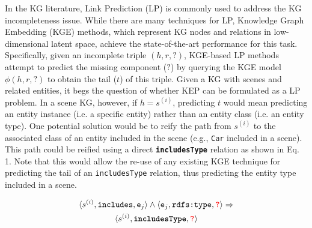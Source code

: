 \documentclass[conference]{IEEEtran}
\begin{document}
In the KG literature, Link Prediction (LP) is commonly used to address the KG incompleteness issue. While there are many techniques for LP, Knowledge Graph Embedding (KGE) methods, which represent KG nodes and relations in low-dimensional latent space, achieve the state-of-the-art performance for this task. Specifically, given an incomplete triple $(h, r, ?)$, KGE-based LP methods attempt to predict the missing component ($?$) by querying the KGE model $\phi(h, r, ?)$ to obtain the tail ($t$) of this triple. Given a KG with scenes and related entities, it begs the question of whether KEP can be formulated as a LP problem. In a scene KG, however, if $h=s^{(i)}$, predicting $t$ would mean predicting an entity instance (i.e. a specific entity) rather than an entity class (i.e. an entity type). One potential solution would be to reify the path from $s^{(i)}$ to the associated class of an entity included in the scene (e.g., \texttt{Car} included in a scene)\cite{wickramarachchi2021knowledge}. This path could be reified using a direct \texttt{\textbf{includesType}} relation as shown in Eq. 1. Note that this would allow the re-use of any existing KGE technique for predicting the tail of an \texttt{includesType} relation, thus predicting the entity type included in a scene.

\vspace{-1em}
\begin{gather*}
\small
    \langle s^{(i)}, \texttt{includes}, \texttt{e}_j \rangle \wedge
    \langle \texttt{e}_j, \texttt{rdfs:type}, \textcolor{red}{\texttt{?}} \rangle 
    \Rightarrow \\
    \langle s^{(i)}, \texttt{\textbf{includesType}}, \textcolor{red}{\texttt{?}} \rangle
\end{gather*}
\end{document}
